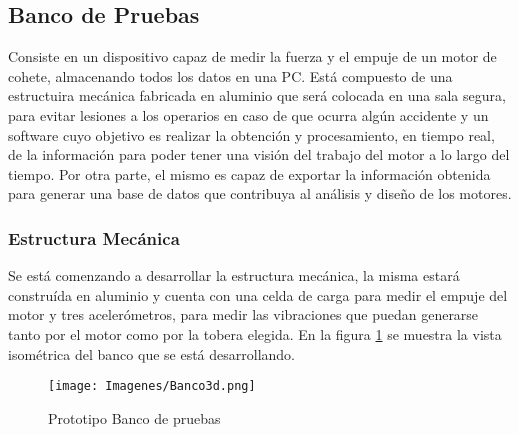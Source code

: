 \documentclass[a4paper]{article} %
\begin{document}
\subsection{Banco de Pruebas}
Consiste en un dispositivo capaz de medir la fuerza y el empuje de un motor de cohete, almacenando todos los datos en una PC. Está compuesto de una estructuira mecánica fabricada en aluminio que será colocada en una sala segura, para evitar lesiones a los operarios en caso de que ocurra algún accidente y un software cuyo objetivo es realizar la obtención y procesamiento, en tiempo real, de la información para poder tener una visión del trabajo del motor a lo largo del tiempo. Por otra parte, el mismo es capaz de exportar la información obtenida para generar una base de datos que contribuya al análisis y diseño de los motores.

\subsubsection{Estructura Mecánica}
Se está comenzando a desarrollar la estructura mecánica, la misma estará construída en aluminio y cuenta con una celda de carga para medir el empuje del motor y tres acelerómetros, para medir las vibraciones que puedan generarse tanto por el motor como por la tobera elegida. En la figura \ref{fig:Banco3d} se muestra la vista isométrica del banco que se está desarrollando.

\begin{figure}[!h]
  \centering
    \texttt{[image: Imagenes/Banco3d.png]}
  \caption{Prototipo Banco de pruebas}
  \label{fig:Banco3d}
\end{figure}
\end{document}
